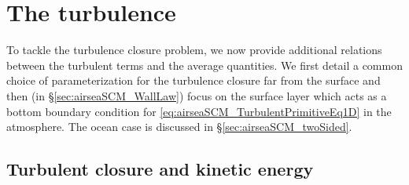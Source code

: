 \section{The turbulence}
\label{sec:airseaSCM_turbulence}
To tackle the turbulence closure problem,
we now provide additional relations between
the turbulent terms and the average quantities.
We first detail a common choice of parameterization
for the turbulence closure far from the surface and then
(in \S\ref{sec:airseaSCM_WallLaw}) focus on the surface layer
which acts as a bottom boundary condition for
\eqref{eq:airseaSCM_TurbulentPrimitiveEq1D} in the atmosphere.
The ocean case is discussed in \S\ref{sec:airseaSCM_twoSided}.
\subsection{Turbulent closure and kinetic energy}
\label{sec:airseaSCM_turbulentClosure}
